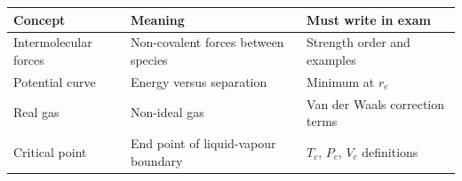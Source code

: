 \documentclass[12pt,a4paper]{article}
\begin{document}
\begin{tcolorbox}[tikzbox, title={Summary Reference Table}]
\begin{tabularx}{\linewidth}{|B{3.2cm}|Y|Y|}
\hline
\textbf{Concept} & \textbf{Meaning} & \textbf{Must write in exam} \\
\hline
Intermolecular forces & Non-covalent forces between species & Strength order and examples \\
\hline
Potential curve & Energy versus separation & Minimum at $r_e$ \\
\hline
Real gas & Non-ideal gas & Van der Waals correction terms \\
\hline
Critical point & End point of liquid-vapour boundary & $T_c$, $P_c$, $V_c$ definitions \\
\hline
\end{tabularx}
\end{tcolorbox}
\end{document}
